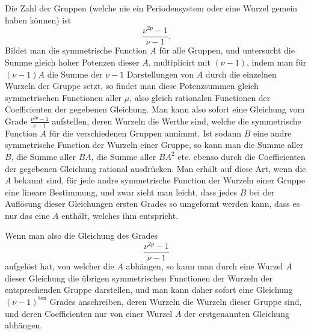 \documentclass[10pt]{article}
\begin{document}
Die Zahl der Gruppen (welche nie ein Periodensystem oder eine Wurzel gemein haben können) ist
\[
\frac{\nu^{2p}-1}{\nu-1}.
\]
Bildet man die symmetrische Function \(A\) für alle Gruppen, und untersucht die Summe gleich hoher Potenzen dieser \(A\), multiplicirt mit \((\nu-1)\), indem man für \((\nu-1)A\) die Summe der \(\nu-1\) Darstellungen von \(A\) durch die einzelnen Wurzeln der Gruppe setzt, so findet man diese Potenzsummen gleich symmetrischen Functionen aller \(\mu\), also gleich rationalen Functionen der Coefficienten der gegebenen Gleichung. Man kann also sofort eine Gleichung vom Grade \(\frac{\nu^{2p}-1}{\nu-1}\) aufstellen, deren Wurzeln die Werthe sind, welche die symmetrische Function \(A\) für die verschiedenen Gruppen annimmt. Ist sodann \(B\) eine andre symmetrische Function der Wurzeln einer Gruppe, so kann man die Summe aller \(B\), die Summe aller \(BA\), die Summe aller \(BA^2\) etc. ebenso durch die Coefficienten der gegebenen Gleichung rational ausdrücken. Man erhält auf diese Art, wenn die \(A\) bekannt sind, für jede andre symmetrische Function der Wurzeln einer Gruppe eine lineare Bestimmung, und zwar sieht man leicht, dass jedes \(B\) bei der Auflösung dieser Gleichungen ersten Grades so umgeformt werden kann, dass es nur das eine \(A\) enthält, welches ihm entspricht.

Wenn man also die Gleichung des Grades
\[
\frac{\nu^{2p}-1}{\nu-1}
\]
aufgelöst hat, von welcher die \(A\) abhängen, so kann man durch eine Wurzel \(A\) dieser Gleichung die übrigen symmetrischen Functionen der Wurzeln der entsprechenden Gruppe darstellen, und man kann daher sofort eine Gleichung \((\nu-1)^{\text{ten}}\) Grades anschreiben, deren Wurzeln die Wurzeln dieser Gruppe sind, und deren Coefficienten nur von einer Wurzel \(A\) der erstgenannten Gleichung abhängen.
\end{document}
